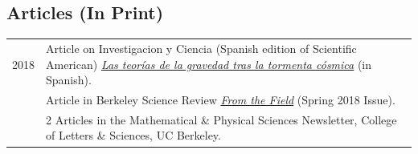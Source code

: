 \documentclass[11pt,a4paper]{article}
\begin{document}
\subsection*{Articles (In Print)}
\vspace{-.3cm}
\begin{longtable}{c p{15cm}}
2018  & {Article} on {Investigacion y Ciencia} (Spanish edition of Scientific American) \href{https://www.investigacionyciencia.es/revistas/investigacion-y-ciencia/un-nuevo-plancton-737/las-teoras-de-la-gravedad-tras-la-tormenta-csmica-16414}{\it Las teor\'ias de la gravedad tras la tormenta c\'osmica} (in Spanish).
\\[2pt]
  & {Article} in {Berkeley Science Review} \href{https://www.berkeleysciencereview.com/article/2018/05/19/from-the-field}{\it From the Field} (Spring 2018 Issue).
\\[2pt]
  & {2 Articles} in the {Mathematical \& Physical Sciences Newsletter}, {College of Letters \& Sciences}, UC Berkeley.
 \end{longtable}
\vspace{-0.1cm}

\end{document}
